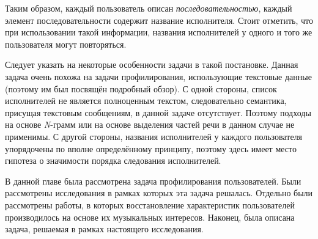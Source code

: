 Таким образом, каждый пользователь описан \textit{последовательностью},
каждый элемент последовательности содержит название исполнителя.
Стоит отметить, что при использовании такой информации, названия
исполнителей у одного и того же пользователя могут повторяться.

Следует указать на некоторые особенности задачи в такой постановке.
Данная задача очень похожа на задачи профилирования,
использующие текстовые данные (поэтому им был посвящён подробный обзор).
С одной стороны, список исполнителей не является полноценным текстом,
следовательно семантика, присущая текстовым сообщениям, в данной задаче
отсутствует. Поэтому подходы на основе \textit{N}-грамм или на основе
выделения частей речи в данном случае не применимы. С другой стороны,
названия исполнителей у каждого пользователя упорядочены по вполне
определённому принципу, поэтому здесь имеет место гипотеза о значимости
порядка следования исполнителей.

\chapterconclusion

В данной главе была рассмотрена задача профилирования пользователей.
Были рассмотрены исследования в рамках которых эта задача решалась.
Отдельно были рассмотрены работы, в которых восстановление
характеристик пользователей производилось на основе их музыкальных
интересов. Наконец, была описана задача, решаемая в
рамках настоящего исследования.
